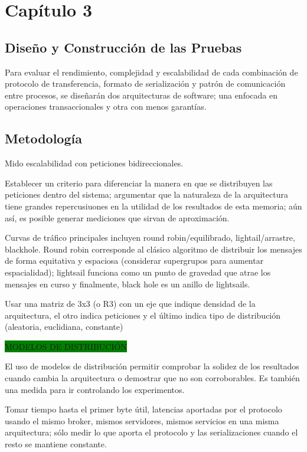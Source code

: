 \chapter{Capítulo 3}

\section{Diseño y Construcción de las Pruebas}

Para evaluar el rendimiento, complejidad y escalabilidad de cada combinación de protocolo de transferencia, formato de serialización y patrón de comunicación entre procesos, se diseñarán dos arquitecturas de software; una enfocada en operaciones transaccionales y otra con menos garantías.

\section{Metodología}

Mido escalabilidad con peticiones bidireccionales.

Establecer un criterio para diferenciar la manera en que se distribuyen las peticiones dentro del sistema; argumentar que la naturaleza de la arquitectura tiene grandes repercusiuones en la utilidad de los resultados de esta memoria; aún así, es posible generar mediciones que sirvan de aproximación.

Curvas de tráfico principales incluyen round robin/equilibrado, lightail/arrastre, blackhole. Round robin corresponde al clásico algoritmo de distribuir los mensajes de forma equitativa y espaciosa (considerar supergrupos para aumentar espacialidad); lightsail funciona como un punto de gravedad que atrae los mensajes en curso y finalmente, black hole es un anillo de lightsails.

Usar una matriz de 3x3 (o R3) con un eje que indique densidad de la arquitectura, el otro indica peticiones y el último indica tipo de distribución (aleatoria, euclidiana, constante)

\colorbox{green}{MODELOS DE DISTRIBUCIÓN}

El uso de modelos de distribución permitir comprobar la solidez de los resultados cuando cambia la arquitectura o demostrar que no son corroborables. Es también una medida para ir controlando los experimentos.

Tomar tiempo hasta el primer byte útil, latencias aportadas por el protocolo usando el mismo broker, mismos servidores, mismos servicios en una misma arquitectura; sólo medir lo que aporta el protocolo y las serializaciones cuando el resto se mantiene constante.

